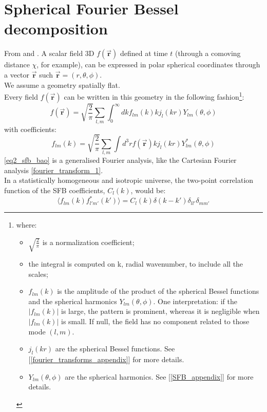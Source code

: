 \section{Spherical Fourier Bessel decomposition}
From \cite{Rassat_Refregier_2012} and \cite{Castro_et_al_2005}. A scalar field 3D $f(\vec{\textbf{r}})$ defined at time $t$ (through a comoving distance $\chi$, for example), can be expressed in polar spherical coordinates through a vector $\vec{\textbf{r}}$ such $\vec{\textbf{r}} = (r, \theta, \phi)$. \\
We assume a geometry spatially flat. \\
Every field $f(\vec{\textbf{r}})$ can be written in this geometry in the following fashion\footnote{
where:
\begin{itemize}
    \item $\sqrt{\frac{2}{\pi}}$ is a normalization coefficient;
    \item the integral is computed on k, radial wavenumber, to include all the scales;
    \item $f_{lm}(k)$ is the amplitude of the product of the spherical Bessel functions and the spherical harmonics $Y_{lm}(\theta, \phi)$. One interpretation: if the $|f_{lm}(k)|$ is large, the pattern is prominent, whereas it is negligible when $|f_{lm}(k)|$ is small. If null, the field has no component related to those mode $(l,m)$.
    \item $j_l(kr)$ are the spherical Bessel functions. See [\ref{fourier_transforms_appendix}] for more details.
    \item $Y_{lm}(\theta, \phi)$ are the spherical harmonics. See [\ref{SFB_appendix}] for more details.
    \end{itemize}
}:
\begin{equation}
\label{eq1_sfb_bao}
    f(\vec{\textbf{r}}) = \sqrt{\frac{2}{\pi}} \sum_{l,m} \int_{0}^{\infty} dk f_{lm}(k) k j_l(kr) Y_{lm}(\theta, \phi)
\end{equation}
with coefficients:
\begin{equation}
\label{eq2_sfb_bao}
    f_{lm}(k) = \sqrt{\frac{2}{\pi}} \sum_{l,m} \int d^3r f(\vec{\textbf{r}}) k j_l(kr) Y^*_{lm}(\theta, \phi)
\end{equation}
\ref{eq2_sfb_bao} is a generalised Fourier analysis, like the Cartesian Fourier analysis \ref{fourier_transform_1}. \\
In a statistically homogeneous and isotropic universe, the two-point correlation function of the SFB coefficients, $C_l(k)$, would be:
\begin{equation}
\label{eq5_sfb_bao}    
\langle f_{lm}(k) f^*_{l'm'}(k')\rangle = C_l(k) \delta(k-k') \delta_{ll'}\delta_{mm'}
\end{equation}

